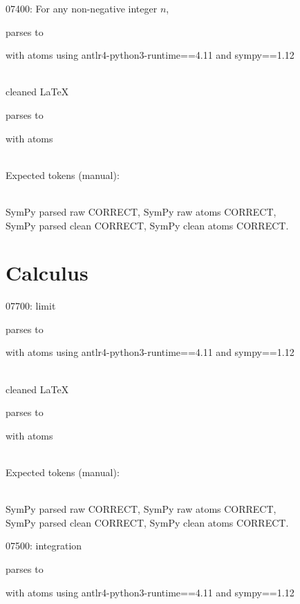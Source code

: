 \documentclass{article}
\begin{document}
\hrulefill

07400:
For any non-negative integer $n$,

parses to

with atoms
using antlr4-python3-runtime==4.11 and sympy==1.12

\ \\
cleaned \LaTeX

parses to

with atoms


\ \\
Expected tokens (manual):



\ \\
SymPy parsed raw CORRECT, 
SymPy raw atoms CORRECT, \\
SymPy parsed clean CORRECT, 
SymPy clean atoms CORRECT.

\hrulefill


\section{Calculus}

07700:
limit

parses to

with atoms
using antlr4-python3-runtime==4.11 and sympy==1.12

\ \\
cleaned \LaTeX

parses to

with atoms


\ \\
Expected tokens (manual):


\ \\
SymPy parsed raw CORRECT, 
SymPy raw atoms CORRECT, \\
SymPy parsed clean CORRECT, 
SymPy clean atoms CORRECT.

\hrulefill

07500:
integration

parses to

with atoms
using antlr4-python3-runtime==4.11 and sympy==1.12
\end{document}
